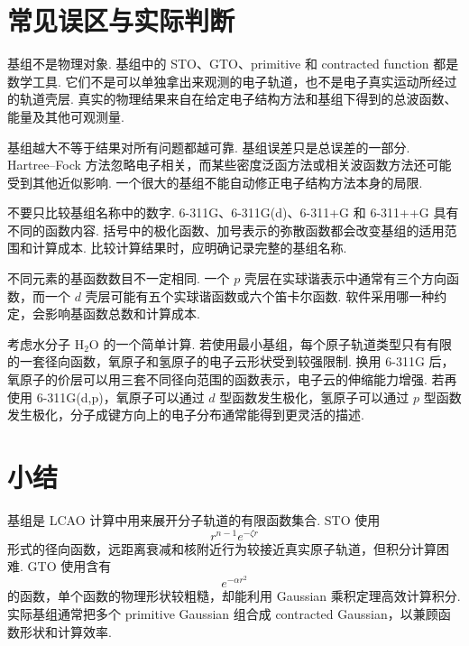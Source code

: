 \documentclass[UTF8,11pt,a4paper,openany]{ctexbook}
\begin{document}
\section{常见误区与实际判断}

\begin{limitbox}
基组不是物理对象. 基组中的 STO、GTO、primitive 和 contracted function 都是数学工具. 它们不是可以单独拿出来观测的电子轨道，也不是电子真实运动所经过的轨道壳层. 真实的物理结果来自在给定电子结构方法和基组下得到的总波函数、能量及其他可观测量. 
\end{limitbox}

\begin{limitbox}
基组越大不等于结果对所有问题都越可靠. 基组误差只是总误差的一部分. Hartree--Fock 方法忽略电子相关，而某些密度泛函方法或相关波函数方法还可能受到其他近似影响. 一个很大的基组不能自动修正电子结构方法本身的局限. 
\end{limitbox}

\begin{limitbox}
不要只比较基组名称中的数字. 6-311G、6-311G(d)、6-311+G 和 6-311++G 具有不同的函数内容. 括号中的极化函数、加号表示的弥散函数都会改变基组的适用范围和计算成本. 比较计算结果时，应明确记录完整的基组名称. 
\end{limitbox}

\begin{limitbox}
不同元素的基函数数目不一定相同. 一个 $p$ 壳层在实球谐表示中通常有三个方向函数，而一个 $d$ 壳层可能有五个实球谐函数或六个笛卡尔函数. 软件采用哪一种约定，会影响基函数总数和计算成本. 
\end{limitbox}

\begin{examplebox}
考虑水分子 $\mathrm{H_2O}$ 的一个简单计算. 若使用最小基组，每个原子轨道类型只有有限的一套径向函数，氧原子和氢原子的电子云形状受到较强限制. 换用 6-311G 后，氧原子的价层可以用三套不同径向范围的函数表示，电子云的伸缩能力增强. 若再使用 6-311G(d,p)，氧原子可以通过 $d$ 型函数发生极化，氢原子可以通过 $p$ 型函数发生极化，分子成键方向上的电子分布通常能得到更灵活的描述. 
\end{examplebox}

\section{小结}

基组是 LCAO 计算中用来展开分子轨道的有限函数集合. STO 使用
\[
r^{n-1}e^{-\zeta r}
\]
形式的径向函数，远距离衰减和核附近行为较接近真实原子轨道，但积分计算困难. GTO 使用含有
\[
e^{-\alpha r^2}
\]
的函数，单个函数的物理形状较粗糙，却能利用 Gaussian 乘积定理高效计算积分. 实际基组通常把多个 primitive Gaussian 组合成 contracted Gaussian，以兼顾函数形状和计算效率. 
\end{document}
